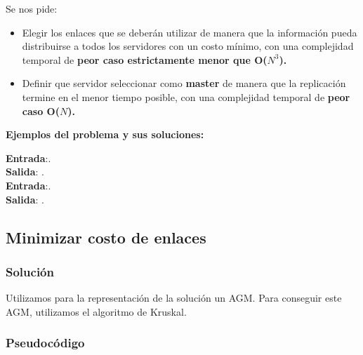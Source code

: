 \documentclass[a4paper, 10pt, twoside]{article}
\begin{document}
Se nos pide:
\begin{itemize}
    \item{Elegir los enlaces que se deberán utilizar de manera que la información pueda distribuirse a todos los servidores con un costo mínimo, con una complejidad temporal de \textbf{peor caso estrictamente menor que O($N^3$).}}
    \item{Definir que servidor seleccionar como \textbf{master} de manera que la replicación termine en el menor tiempo posible, con una complejidad temporal de \textbf{peor caso O($N$).}}
\end{itemize}

\textbf{Ejemplos del problema y sus soluciones:}

\textbf{Entrada}:. \\
\textbf{Salida}: . \\

\textbf{Entrada}:. \\
\textbf{Salida}: . \\

\subsection{Minimizar costo de enlaces}
\subsubsection{Solución}
Utilizamos para la representación de la solución un AGM. 
Para conseguir este AGM, utilizamos el algoritmo de Kruskal.

\subsubsection{Pseudocódigo}
\end{document}
